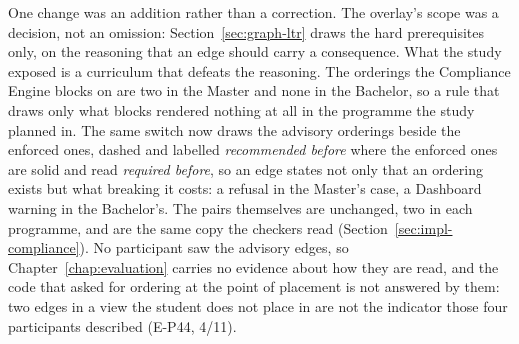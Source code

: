 One change was an addition rather than a correction. The overlay's scope was a decision, not an omission: Section~\ref{sec:graph-ltr} draws the hard prerequisites only, on the reasoning that an edge should carry a consequence. What the study exposed is a curriculum that defeats the reasoning. The orderings the Compliance Engine blocks on are two in the Master and none in the Bachelor, so a rule that draws only what blocks rendered nothing at all in the programme the study planned in. The same switch now draws the advisory orderings beside the enforced ones, dashed and labelled \emph{recommended before} where the enforced ones are solid and read \emph{required before}, so an edge states not only that an ordering exists but what breaking it costs: a refusal in the Master's case, a Dashboard warning in the Bachelor's. The pairs themselves are unchanged, two in each programme, and are the same copy the checkers read (Section~\ref{sec:impl-compliance}). No participant saw the advisory edges, so Chapter~\ref{chap:evaluation} carries no evidence about how they are read, and the code that asked for ordering at the point of placement is not answered by them: two edges in a view the student does not place in are not the indicator those four participants described (E-P44, 4/11).


